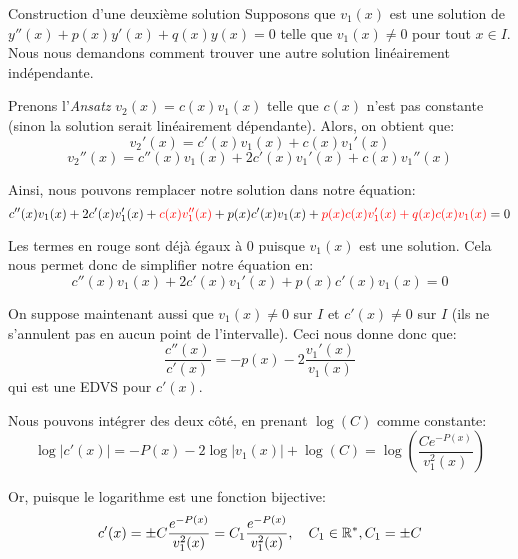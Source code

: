 \documentclass[a4paper]{article}
\begin{document}
\begin{parag}{Construction d'une deuxième solution}
        Supposons que $v_1\left(x\right)$ est une solution de $y''\left(x\right) + p\left(x\right)y'\left(x\right) + q\left(x\right) y\left(x\right) = 0$ telle que $v_1\left(x\right) \neq 0$ pour tout $x \in I$. Nous nous demandons comment trouver une autre solution linéairement indépendante.

        Prenons l'\textit{Ansatz} $v_2\left(x\right) = c\left(x\right) v_1\left(x\right)$ telle que $c\left(x\right)$ n'est pas constante (sinon la solution serait linéairement dépendante). Alors, on obtient que: 
        \[v_2'\left(x\right) = c'\left(x\right) v_1\left(x\right) + c\left(x\right) v_1'\left(x\right)\]
        \[v_2''\left(x\right) = c''\left(x\right) v_1\left(x\right) + 2c'\left(x\right)v_1'\left(x\right) + c\left(x\right)v_1''\left(x\right)\]

        Ainsi, nous pouvons remplacer notre solution dans notre équation: 
        \[c''\left(x\right) v_1\left(x\right) + 2c'\left(x\right) v_1'\left(x\right) + {\color{red}c\left(x\right)v_1''\left(x\right)} + p\left(x\right)c'\left(x\right) v_1\left(x\right) + {\color{red}p\left(x\right) c\left(x\right) v_1'\left(x\right) + q\left(x\right) c\left(x\right) v_1\left(x\right)} = 0\]

        Les termes en rouge sont déjà égaux à 0 puisque $v_1\left(x\right)$ est une solution. Cela nous permet donc de simplifier notre équation en: 
        \[c''\left(x\right)v_1\left(x\right) + 2c'\left(x\right) v_1'\left(x\right) + p\left(x\right)c'\left(x\right) v_1\left(x\right) = 0\]
        
        On suppose maintenant aussi que $v_1\left(x\right) \neq 0$ sur $I$ et $c'\left(x\right) \neq 0$ sur $I$ (ils ne s'annulent pas en aucun point de l'intervalle). Ceci nous donne donc que: 
        \[\frac{c''\left(x\right)}{c'\left(x\right)} = -p\left(x\right) - 2 \frac{v_1'\left(x\right)}{v_1\left(x\right)}\]
        qui est une EDVS pour $c'\left(x\right)$.

        Nous pouvons intégrer des deux côté, en prenant $\log\left(C\right)$ comme constante: 
        \[\log\left|c'\left(x\right)\right| = -P\left(x\right) - 2\log\left|v_1\left(x\right)\right| + \log\left(C\right) = \log\left(\frac{Ce^{-P\left(x\right)}}{v_1^2\left(x\right)}\right)\]
        
        Or, puisque le logarithme est une fonction bijective: 
        \[c'\left(x\right) = \pm C \frac{e^{-P\left(x\right)}}{v_1^2\left(x\right)} = C_1 \frac{e^{-P\left(x\right)}}{v_1^2\left(x\right)}, \mathspace C_1 \in \mathbb{R}^*, C_1 = \pm C\]
        

\end{parag}
\end{document}
